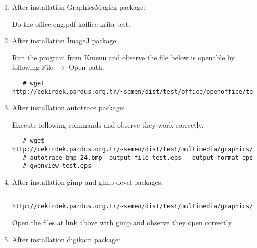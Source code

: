 \documentclass[a4paper,10pt]{article}
\begin{document}
\begin{enumerate}
After taht, execute gimp command and observe laguage is changed to which you decide.
\begin{verbatim}
gimp-i18n-es
gimp-i18n-sk
gimp-i18n-sl
gimp-i18n-sr
gimp-i18n-sr_Latn
gimp-i18n-sv
gimp-i18n-ta
gimp-i18n-th
gimp-i18n-tt
gimp-i18n-uk
gimp-i18n-vi
gimp-i18n-et
gimp-i18n-eu
gimp-i18n-fa
gimp-i18n-fi
gimp-i18n-fr
gimp-i18n-ga
gimp-i18n-gl
gimp-i18n-gu
gimp-i18n-he
gimp-i18n-hi
gimp-i18n-xh
gimp-i18n-yi
gimp-i18n-zh_CN
gimp-i18n-zh_HK
gimp-i18n-zh_TW
gimp-i18n-hr
gimp-i18n-hu
gimp-i18n-id
gimp-i18n-is
gimp-i18n-it
gimp-i18n-ja
gimp-i18n-ka
gimp-i18n-km
gimp-i18n-kn
gimp-i18n-ko
gimp-i18n-lt
gimp-i18n-lv
gimp-i18n-mk
gimp-i18n-ml
gimp-i18n-mr
gimp-i18n-ms
gimp-i18n-nb
gimp-i18n-ne
gimp-i18n-nl
gimp-i18n-nn
gimp-i18n-oc
gimp-i18n-or
gimp-i18n-pa
gimp-i18n-pl
gimp-i18n-pt
gimp-i18n-pt_BR
gimp-i18n-ro
gimp-i18n-ru
gimp-i18n-rw
gimp-i18n-si 
\end{verbatim}


 \item After installation GraphicsMagick package:

Do the office-eng.pdf koffice-krita test.

 \item After installation İmageJ package:

 Run the program from Kmenu and observe the file below is openable by following File $\rightarrow$ Open path.
  \begin{verbatim}
   # wget http://cekirdek.pardus.org.tr/~semen/dist/test/office/openoffice/test_oodraw.jpg
  \end{verbatim}

\item After installation autotrace package:

Execute following commands and observe they work correctly.
  \begin{verbatim}
   # wget http://cekirdek.pardus.org.tr/~semen/dist/test/multimedia/graphics/bmp_24.bmp
   # autotrace bmp_24.bmp -output-file test.eps  -output-format eps
   # gwenview test.eps 
  \end{verbatim}

 \item After installation gimp and gimp-devel packages:
  \begin{verbatim}
   http://cekirdek.pardus.org.tr/~semen/dist/test/multimedia/graphics/graphics.tar
  \end{verbatim}

 Open the files at link above with gimp and observe they open correctly.
\item After installation digikam package:


\end{enumerate}
\end{document}
